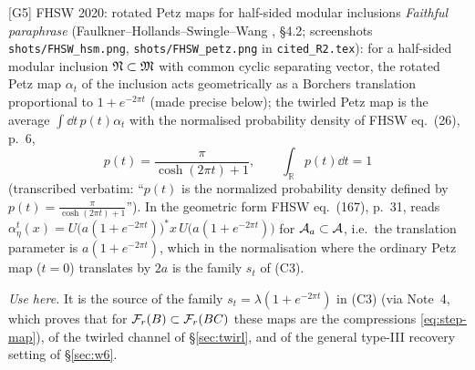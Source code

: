 \documentclass[11pt]{article}
\newcommand{\Fr}{\cF_r}
\theoremstyle{definition}\newtheorem{example}[theorem]{Example}
\begin{document}
\begin{citedbox}{[G5] FHSW 2020: rotated Petz maps for half-sided modular
inclusions}
\emph{Faithful paraphrase} (Faulkner--Hollands--Swingle--Wang \cite{FHSW}, \S4.2; screenshots
\texttt{shots/FHSW\_hsm.png}, \texttt{shots/FHSW\_petz.png} in \texttt{cited\_R2.tex}): for a
half-sided modular inclusion $\mathfrak N\subset\mathfrak M$ with common cyclic separating vector, the rotated
Petz map $\alpha_t$ of the inclusion acts geometrically as a Borchers translation
proportional to $1+e^{-2\pi t}$ (made precise below); the twirled Petz map is the average $\int\dd t\,p(t)\alpha_t$ with the normalised probability
density of FHSW eq.~(26), p.~6,
\[
 p(t)=\frac\pi{\cosh(2\pi t)+1},\qquad \int_{\mathbb R}p(t)\dd t=1
\]
(transcribed verbatim: ``$p(t)$ is the normalized probability density defined by
$p(t)=\frac\pi{\cosh(2\pi t)+1}$'').  In the geometric form FHSW eq.~(167), p.~31, reads
$\alpha^t_\eta(x)=U\bigl(a(1+e^{-2\pi t})\bigr)^*x\,U\bigl(a(1+e^{-2\pi t})\bigr)$ for
$\mathcal A_a\subset\mathcal A$, i.e.\ the translation parameter is $a(1+e^{-2\pi t})$, which in the
normalisation where the ordinary Petz map ($t=0$) translates by $2a$ is the family $s_t$ of
(C3).

\emph{Use here.}  It is the source of the family $s_t=\lambda(1+e^{-2\pi t})$ in (C3) (via Note~4,
which proves that for $\Fr(B)\subset\Fr(BC)$ these maps are the compressions \eqref{eq:step-map}),
of the twirled channel of \S\ref{sec:twirl}, and of the general type-III recovery setting of
\S\ref{sec:w6}.

\smallskip\noindent{}

\smallskip\noindent{}
\end{citedbox}
\end{document}
